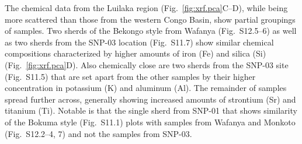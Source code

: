 \documentclass[preprint,10pt,oneside,onecolumn,authoryear]{elsarticle}
\begin{document}
The chemical data from the Luilaka region (Fig.~\ref{fig:xrf.pca}C--D), while being more scattered than those from the western Congo Basin, show partial groupings of samples. Two sherds of the Bekongo style from Wafanya (Fig.~S12.5--6) as well as two sherds from the SNP-03 location (Fig.~S11.7) show similar chemical compositions characterized by higher amounts of iron (Fe) and silica (Si) (Fig.~\ref{fig:xrf.pca}D). Also chemically close are two sherds from the SNP-03 site (Fig.~S11.5) that are set apart from the other samples by their higher concentration in potassium (K) and aluminum (Al). The remainder of samples spread further across, generally showing increased amounts of strontium (Sr) and titanium (Ti). Notable is that the single sherd from SNP-01 that shows similarity of the Bokuma style (Fig.~S11.1) plots with samples from Wafanya and Monkoto (Fig.~S12.2--4, 7) and not the samples from SNP-03.
\end{document}
